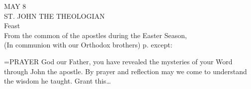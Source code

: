 \begin{center}\normalsize MAY 8\\
\footnotesize ST. JOHN THE THEOLOGIAN\\
\footnotesize Feast\\
\footnotesize From the common of the apostles during the Easter Season,\\
\footnotesize (In communion with our Orthodox brothers) p.     except:\\
\end{center}

\hangindent=\parindent \small{PRAYER 
God our Father, you have revealed the mysteries of your Word through John the apostle. By prayer and reflection may we come to understand the wisdom he taught. Grant this…\\}
 
